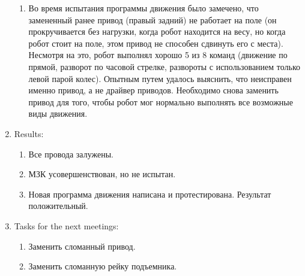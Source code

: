 \begin{enumerate}
\begin{enumerate}
	   \item Во время испытания программы движения было замечено, что замененный ранее привод (правый задний) не работает на поле (он прокручивается без нагрузки, когда робот находится на весу, но когда робот стоит на поле, этом привод не способен сдвинуть его с места). Несмотря на это, робот выполнял хорошо 5 из 8 команд (движение по прямой, разворот по часовой стрелке, развороты с использованием только левой парой колес). Опытным путем удалось выяснить, что неисправен именно привод, а не драйвер приводов. Необходимо снова заменить привод для того, чтобы робот мог нормально выполнять все возможные виды движения.
	   
	\end{enumerate}
	
	\item Results:
	\begin{enumerate}
		
		\item Все провода залужены.
		
		\item МЗК усовершенствован, но не испытан.
		
        \item Новая программа движения написана и протестирована. Результат положительный.
		
	\end{enumerate}
	
	\item Tasks for the next meetings:
	\begin{enumerate}
		
		\item Заменить сломанный привод.
		
		\item Заменить сломанную рейку подъемника.
			
	\end{enumerate}
\end{enumerate}
\fillpage
